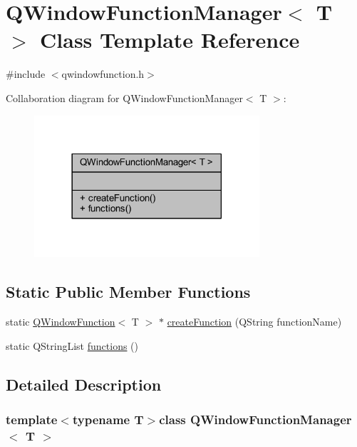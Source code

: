 \hypertarget{a00072}{\section{Q\+Window\+Function\+Manager$<$ T $>$ Class Template Reference}
\label{a00072}
}


{\ttfamily \#include $<$qwindowfunction.\+h$>$}



Collaboration diagram for Q\+Window\+Function\+Manager$<$ T $>$\+:
\nopagebreak
\begin{figure}[H]
\begin{center}
\leavevmode
\includegraphics[width=237pt]{d0/d79/a00553}
\end{center}
\end{figure}
\subsection*{Static Public Member Functions}
\begin{DoxyCompactItemize}
\item 
static \hyperlink{a00071}{Q\+Window\+Function}$<$ T $>$ $\ast$ \hyperlink{a00072_a3c72b178730b8731087337bcbfcbd4b7}{create\+Function} (Q\+String function\+Name)
\item 
static Q\+String\+List \hyperlink{a00072_ae0508780c15f6c28fb566dfe76c9a082}{functions} ()
\end{DoxyCompactItemize}


\subsection{Detailed Description}
\subsubsection*{template$<$typename T$>$class Q\+Window\+Function\+Manager$<$ T $>$}



